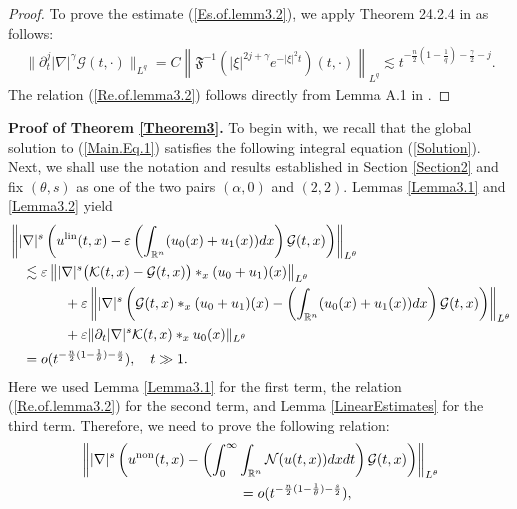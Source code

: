 \documentclass[11pt,reqno]{amsart}
\begin{document}
\begin{proof}
To prove the estimate (\ref{Es.of.lemm3.2}), we apply Theorem 24.2.4 in \cite{EbertReissig2018} as follows:
    \begin{align*}
        \|\partial_t^j |\nabla|^{\gamma} \mathcal{G}(t,\cdot)\|_{L^q} =C \left\|\mathfrak{F}^{-1}\left(|\xi|^{2j+\gamma}e^{-|\xi|^2t}\right)(t,\cdot)\right\|_{L^q} \lesssim t^{-\frac{n}{2}(1-\frac{1}{q})-\frac{\gamma}{2}-j}.
    \end{align*}
  The relation (\ref{Re.of.lemma3.2}) follows directly from Lemma A.1 in \cite{IkehataMichihisa2019}.
\end{proof}
\textbf{Proof of Theorem \ref{Theorem3}.} To begin with, we recall that the global solution to (\ref{Main.Eq.1}) satisfies the following integral equation (\ref{Solution}). Next,
we shall use the notation and results established in Section \ref{Section2} and fix $(\theta, s)$ as one of the two pairs $(\alpha, 0)$ and $(2,2)$. Lemmas \ref{Lemma3.1} and \ref{Lemma3.2} yield
\begin{align*}
    &\left\||\nabla|^s \left(u^{\rm lin}(t,x)-\varepsilon\left(\int_{\mathbb{R}^n}(u_0(x) + u_1(x))dx\right)\mathcal{G}(t,x)\right) \right\|_{L^\theta}\\
    &\quad \lesssim \varepsilon\left\||\nabla|^s\big(\mathcal{K}(t,x)-\mathcal{G}(t,x)\big)\ast_x (u_0+ u_1)(x)\right\|_{L^\theta} \\
    &\quad\qquad\quad+ \varepsilon\left\||\nabla|^s\left(\mathcal{G}(t,x) \ast_x(u_0+u_1)(x)-\left(\int_{\mathbb{R}^n} (u_0(x)+u_1(x))dx\right) \mathcal{G}(t,x)\right) \right\|_{L^\theta} \\
    &\quad\qquad\quad+ \varepsilon\|\partial_t |\nabla|^s \mathcal{K}(t,x) \ast_x u_0(x)\|_{L^\theta} \\
    &\quad = o(t^{-\frac{n}{2}(1-\frac{1}{\theta})-\frac{s}{2}}), \quad t \gg 1.
\end{align*}
Here we used Lemma \ref{Lemma3.1} for the first term, the relation (\ref{Re.of.lemma3.2}) for the second term, and Lemma \ref{LinearEstimates} for the third term.
Therefore, we need to prove the following relation:
\begin{align}
    &\left\||\nabla|^s \left(u^{\rm non}(t,x)- \left(\int_0^{\infty} \int_{\mathbb{R}^n} \mathcal{N}(u(t, x))dxdt\right) \mathcal{G}(t,x) \right)\right\|_{L^{\theta}} \notag\\
    &\hspace{4cm}= o(t^{-\frac{n}{2}(1-\frac{1}{\theta})-\frac{s}{2}}) , \label{Main.Rela.1}
\end{align}
\end{document}
